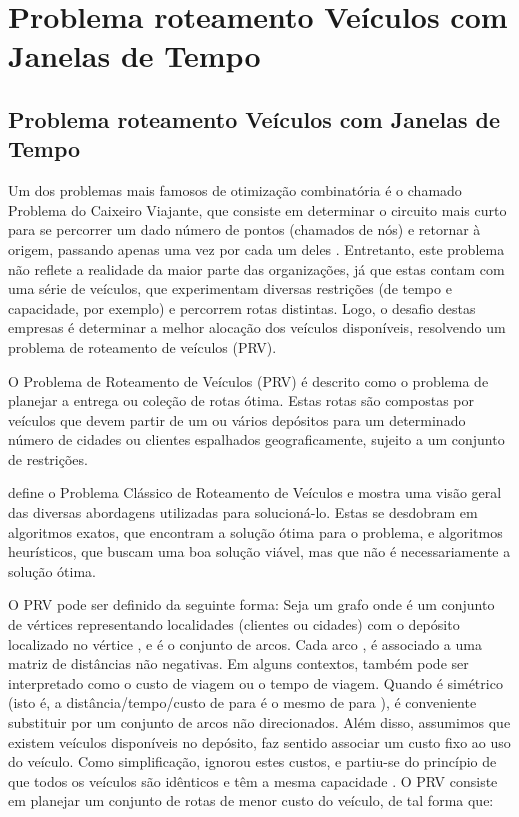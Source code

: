﻿\chapter{Problema roteamento Veículos com Janelas de Tempo}
\label{cap:Problema_roteamento}

\section{Problema roteamento Veículos com Janelas de Tempo}

Um dos problemas mais famosos de otimização combinatória é o chamado Problema do Caixeiro Viajante, que consiste em determinar o circuito mais curto para se percorrer um dado número de pontos (chamados de nós) e retornar à origem, passando apenas uma vez por cada um deles \cite{lieberman10}. Entretanto, este problema não reflete a realidade da maior parte das organizações, já que estas contam com uma série de veículos, que experimentam diversas restrições (de tempo e capacidade, por exemplo) e percorrem rotas distintas. Logo, o desafio destas empresas é determinar a melhor alocação dos veículos disponíveis, resolvendo um problema de roteamento de veículos (PRV).

O Problema de Roteamento de Veículos (PRV) é descrito como o problema de planejar a entrega ou coleção de rotas ótima. Estas rotas são compostas por veículos que devem partir de um ou vários depósitos para um determinado número de cidades ou clientes espalhados geograficamente, sujeito a um conjunto de restrições.

\cite{laporte92} define o Problema Clássico de Roteamento de Veículos e mostra uma visão geral das diversas abordagens utilizadas para solucioná-lo. Estas se desdobram em algoritmos exatos, que encontram a solução ótima para o problema, e algoritmos heurísticos, que buscam uma boa solução viável, mas que não é necessariamente a solução ótima.

O PRV pode ser definido da seguinte forma: Seja um grafo onde é um conjunto de vértices representando localidades (clientes ou cidades) com o depósito localizado no vértice , e é o conjunto de arcos. Cada arco , é associado a uma matriz de distâncias não negativas. Em alguns contextos, também pode ser interpretado como o custo de viagem ou o tempo de viagem. Quando é simétrico (isto é, a distância/tempo/custo de para é o mesmo de para ), é conveniente substituir por um conjunto de arcos não direcionados. Além disso, assumimos que existem veículos disponíveis no depósito, faz sentido associar um custo fixo ao uso do veículo. Como simplificação, \cite{laporte92} ignorou estes custos, e partiu-se do princípio de que todos os veículos são idênticos e têm a mesma capacidade . O PRV consiste em planejar um conjunto de rotas de menor custo do veículo, de tal forma que:

